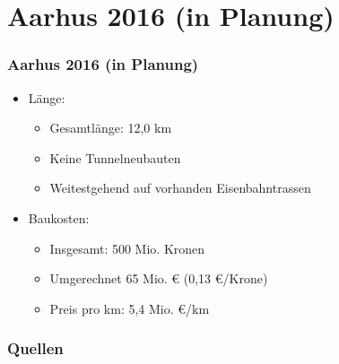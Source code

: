 \documentclass{beamer}
\begin{document}

\section{Aarhus 2016 (in Planung)}
\begin{frame}
  \frametitle{Aarhus 2016 (in Planung)}

  \begin{itemize}
    \item Länge:
      \begin{itemize}
        \item Gesamtlänge: 12,0 km
        \item Keine Tunnelneubauten
        \item Weitestgehend auf vorhanden Eisenbahntrassen
      \end{itemize}
    \item Baukosten:
      \begin{itemize}
        \item Insgesamt: 500 Mio. Kronen
        \item Umgerechnet 65 Mio. € (0,13 €/Krone)
        \item Preis pro km: 5,4 Mio. €/km
      \end{itemize}
  \end{itemize}
\end{frame}


\begin{frame}[allowframebreaks]
  \frametitle{Quellen}

  
\end{frame}

\end{document}
